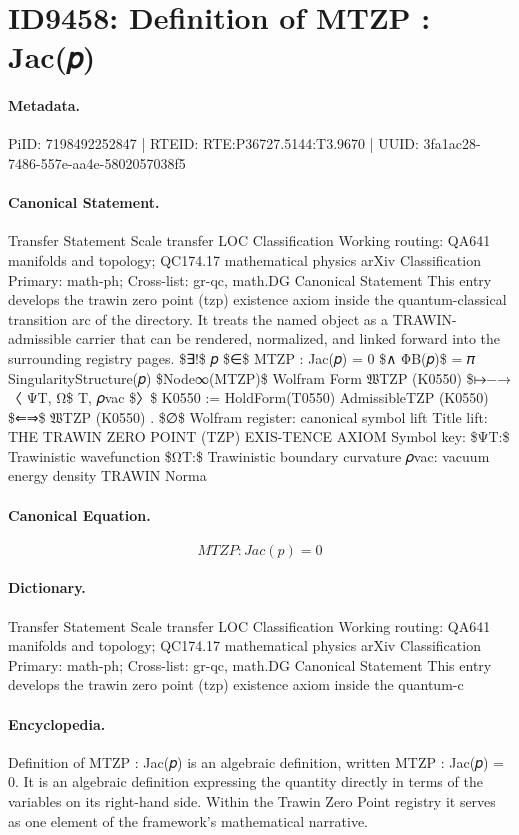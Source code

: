 \section*{ID9458: Definition of MTZP : Jac(𝑝)}
\paragraph{Metadata.}
PiID: 7198492252847 | RTEID: RTE:P36727.5144:T3.9670 | UUID: 3fa1ac28-7486-557e-aa4e-5802057038f5

\paragraph{Canonical Statement.}
Transfer Statement Scale transfer LOC Classification Working routing: QA641 manifolds and topology; QC174.17 mathematical physics arXiv Classification Primary: math-ph; Cross-list: gr-qc, math.DG Canonical Statement This entry develops the trawin zero point (tzp) existence axiom inside the quantum-classical transition arc of the directory. It treats the named object as a TRAWIN-admissible carrier that can be rendered, normalized, and linked forward into the surrounding registry pages. \$∃!\$ 𝑝 \$∈\$ MTZP : Jac(𝑝) = 0 \$∧ ΦB(𝑝)\$ = 𝜋 SingularityStructure(𝑝)  \$Node∞(MTZP)\$ Wolfram Form 𝔚TZP (K0550) \$↦−→ 〈 ΨT, Ω\$ T, 𝜌vac \$〉\$ K0550 := HoldForm(T0550) AdmissibleTZP (K0550) \$⇐⇒\$ 𝔚TZP (K0550) . \$∅\$ Wolfram register: canonical symbol lift Title lift: THE TRAWIN ZERO POINT (TZP) EXIS-TENCE AXIOM Symbol key: \$ΨT:\$ Trawinistic wavefunction \$ΩT:\$ Trawinistic boundary curvature 𝜌vac: vacuum energy density TRAWIN Norma

\paragraph{Canonical Equation.}
\[
MTZP : Jac(𝑝) = 0
\]

\paragraph{Dictionary.}
Transfer Statement Scale transfer LOC Classification Working routing: QA641 manifolds and topology; QC174.17 mathematical physics arXiv Classification Primary: math-ph; Cross-list: gr-qc, math.DG Canonical Statement This entry develops the trawin zero point (tzp) existence axiom inside the quantum-c

\paragraph{Encyclopedia.}
Definition of MTZP : Jac(𝑝) is an algebraic definition, written MTZP : Jac(𝑝) = 0. It is an algebraic definition expressing the quantity directly in terms of the variables on its right-hand side. Within the Trawin Zero Point registry it serves as one element of the framework's mathematical narrative.
